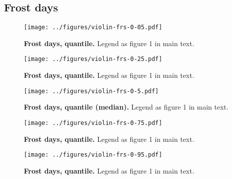 \documentclass[12pt]{report}
\begin{document}
\subsection{Frost days}
\begin{figure}[h!]
  \begin{center}
    \texttt{[image: ../figures/violin-frs-0-05.pdf]}
  \end{center}
  \caption{\textbf{Frost days,  quantile.} Legend as
    figure 1 in main text.}
\end{figure}
\begin{figure}[h!]
  \begin{center}
    \texttt{[image: ../figures/violin-frs-0-25.pdf]}
  \end{center}
  \caption{\textbf{Frost days,  quantile.} Legend as
    figure 1 in main text.}
\end{figure}
\begin{figure}[h!]
  \begin{center}
    \texttt{[image: ../figures/violin-frs-0-5.pdf]}
  \end{center}
  \caption{\textbf{Frost days,  quantile (median).}
    Legend as figure 1 in main text.}
\end{figure}
\begin{figure}[h!]
  \begin{center}
    \texttt{[image: ../figures/violin-frs-0-75.pdf]}
  \end{center}
  \caption{\textbf{Frost days,  quantile.} Legend as
    figure 1 in main text.}
\end{figure}
\begin{figure}[h!]
  \begin{center}
    \texttt{[image: ../figures/violin-frs-0-95.pdf]}
  \end{center}
  \caption{\textbf{Frost days,  quantile.} Legend as
    figure 1 in main text.}
\end{figure}

\clearpage
\end{document}
